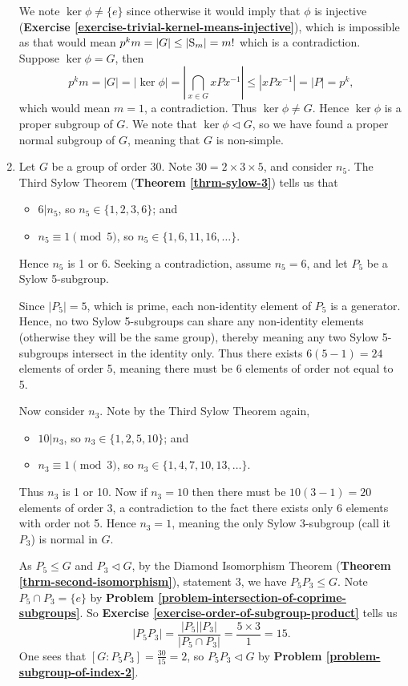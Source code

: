 \begin{enumerate}
    We note $\ker\phi \neq \{e\}$ since otherwise it would imply that $\phi$ is injective (\textbf{Exercise \ref{exercise-trivial-kernel-means-injective}}), which is impossible as that would mean $p^km = |G| \leq |\mathrm{S}_{m}| = m!$ which is a contradiction. Suppose $\ker\phi = G$, then
    \[
        p^km = |G| = |\ker\phi| = \left|\bigcap_{x \in G} xPx^{-1}\right| \leq |xPx^{-1}| = |P| = p^k,
    \]
    which would mean $m = 1$, a contradiction. Thus $\ker\phi \neq G$. Hence $\ker\phi$ is a proper subgroup of $G$. We note that $\ker\phi \lhd G$, so we have found a proper normal subgroup of $G$, meaning that $G$ is non-simple.

    \item Let $G$ be a group of order 30. Note $30 = 2 \times 3 \times 5$, and consider $n_5$. The Third Sylow Theorem (\textbf{Theorem \ref{thrm-sylow-3}}) tells us that
    \begin{itemize}
        \item $6 \vert n_5$, so $n_5 \in \{1, 2, 3, 6\}$; and
        \item $n_5 \equiv 1 \pmod 5$, so $n_5 \in \{1, 6, 11, 16, \dots\}$.
    \end{itemize}
    Hence $n_5$ is 1 or 6. Seeking a contradiction, assume $n_5 = 6$, and let $P_5$ be a Sylow 5-subgroup.

    Since $|P_5| = 5$, which is prime, each non-identity element of $P_5$ is a generator. Hence, no two Sylow 5-subgroups can share any non-identity elements (otherwise they will be the same group), thereby meaning any two Sylow 5-subgroups intersect in the identity only. Thus there exists $6(5-1) = 24$ elements of order 5, meaning there must be 6 elements of order not equal to 5.

    Now consider $n_3$. Note by the Third Sylow Theorem again,
    \begin{itemize}
        \item $10 \vert n_3$, so $n_3 \in \{1, 2, 5, 10\}$; and
        \item $n_3 \equiv 1 \pmod 3$, so $n_3 \in \{1, 4, 7, 10, 13, \dots\}$.
    \end{itemize}
    Thus $n_3$ is 1 or 10. Now if $n_3 = 10$ then there must be $10(3-1) = 20$ elements of order 3, a contradiction to the fact there exists only 6 elements with order not 5. Hence $n_3 = 1$, meaning the only Sylow 3-subgroup (call it $P_3$) is normal in $G$.

    As $P_5 \leq G$ and $P_3 \lhd G$, by the Diamond Isomorphism Theorem (\textbf{Theorem \ref{thrm-second-isomorphism}}), statement 3, we have $P_5P_3 \leq G$. Note $P_5 \cap P_3 = \{e\}$ by \textbf{Problem \ref{problem-intersection-of-coprime-subgroups}}. So \textbf{Exercise \ref{exercise-order-of-subgroup-product}} tells us
    \[
        |P_5P_3| = \frac{|P_5||P_3|}{|P_5 \cap P_3|} = \frac{5\times3}{1} = 15.
    \]
    One sees that $[G:P_5P_3] = \frac{30}{15} = 2$, so $P_5P_3 \lhd G$ by \textbf{Problem \ref{problem-subgroup-of-index-2}}.


\end{enumerate}
